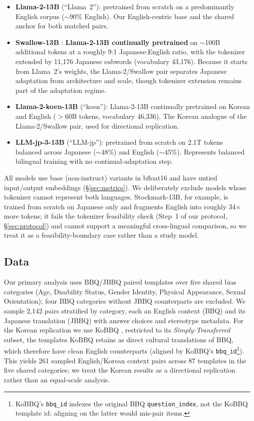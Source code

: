 \documentclass[11pt]{article}
\begin{document}
\begin{itemize}
\item \textbf{Llama-2-13B} \citep{touvron2023llama2} (``Llama~2''): pretrained from scratch on a predominantly English corpus ($\sim$90\% English). Our English-centric base and the shared anchor for both matched pairs.
\item \textbf{Swallow-13B} \citep{fujii2024swallow}: \textbf{Llama-2-13B continually pretrained} on $\sim$100B additional tokens at a roughly 9:1 Japanese:English ratio, with the tokenizer extended by 11{,}176 Japanese subwords (vocabulary 43{,}176). Because it starts from Llama~2's weights, the Llama-2/Swallow pair separates Japanese adaptation from architecture and scale, though tokenizer extension remains part of the adaptation regime.
\item \textbf{Llama-2-koen-13B} \citep{lee2023llama2koen} (``koen''): Llama-2-13B continually pretrained on Korean and English ($>$60B tokens, vocabulary 46{,}336). The Korean analogue of the Llama-2/Swallow pair, used for directional replication.
\item \textbf{LLM-jp-3-13B} \citep{llmjp2024} (``LLM-jp''): pretrained from scratch on 2.1T tokens balanced across Japanese ($\sim$48\%) and English ($\sim$45\%). Represents balanced bilingual training with no continual-adaptation step.
\end{itemize}

All models use base (non-instruct) variants in bfloat16 and have untied input/output embeddings (\S\ref{sec:metrics}). We deliberately exclude models whose tokenizer cannot represent both languages. Stockmark-13B, for example, is trained from scratch on Japanese only and fragments English into roughly 34$\times$ more tokens; it fails the tokenizer feasibility check (Step~1 of our protocol, \S\ref{sec:protocol}) and cannot support a meaningful cross-lingual comparison, so we treat it as a feasibility-boundary case rather than a study model.

\subsection{Data}

Our primary analysis uses BBQ/JBBQ paired templates over five shared bias categories (Age, Disability Status, Gender Identity, Physical Appearance, Sexual Orientation); four BBQ categories without JBBQ counterparts are excluded. We sample 2{,}142 pairs stratified by category, each an English context (BBQ) and its Japanese translation (JBBQ) with answer choices and stereotype metadata. For the Korean replication we use KoBBQ \citep{jin-etal-2024-kobbq}, restricted to its \textit{Simply-Transferred} subset, the templates KoBBQ retains as direct cultural translations of BBQ, which therefore have clean English counterparts (aligned by KoBBQ's \texttt{bbq\_id}\footnote{KoBBQ's \texttt{bbq\_id} indexes the original BBQ \texttt{question\_index}, not the KoBBQ template id; aligning on the latter would mis-pair items.}). This yields 261 sampled English/Korean context pairs across 87 templates in the five shared categories; we treat the Korean results as a directional replication rather than an equal-scale analysis.
\end{document}
